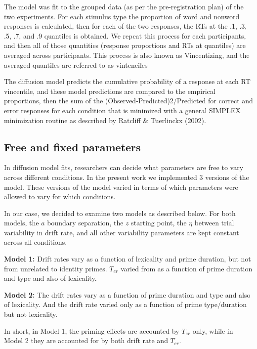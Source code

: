\documentclass[
  english,
  man]{apa6}
\begin{document}
\begin{appendix}
The model was fit to the grouped data (as per the pre-registration plan)
of the two experiments. For each stimulus type the proportion of word
and nonword responses is calculated, then for each of the two responses,
the RTs at the .1, .3, .5, .7, and .9 quantiles is obtained. We repeat
this process for each participants, and then all of those quantities
(response proportions and RTs at quantiles) are averaged across
participants. This process is also known as Vincentizing, and the
averaged quantiles are referred to as vintenciles

The diffusion model predicts the cumulative probability of a response at
each RT vincentile, and these model predictions are compared to the
empirical proportions, then the sum of the
(Observed-Predicted)2/Predicted for correct and error responses for each
condition that is minimized with a general SIMPLEX minimization routine
as described by Ratcliff \& Tuerlinckx (2002).

\hypertarget{free-and-fixed-parameters}{%
\subsection{Free and fixed parameters}\label{free-and-fixed-parameters}}

In diffusion model fits, researchers can decide what parameters are free
to vary across different conditions. In the present work we implemented
3 versions of the model. These versions of the model varied in terms of
which parameters were allowed to vary for which conditions.

In our case, we decided to examine two models as described below. For
both models, the \(a\) boundary separation, the \(z\) starting point,
the \(\eta\) between trial variability in drift rate, and all other
variability parameters are kept constant across all conditions.

\textbf{Model 1:} Drift rates vary as a function of lexicality and prime
duration, but not from unrelated to identity primes. \(T_{er}\) varied
from as a function of prime duration and type and also of lexicality.

\textbf{Model 2:} The drift rates vary as a function of prime duration
and type and also of lexicality. And the drift rate varied only as a
function of prime type/duration but not lexicality.

In short, in Model 1, the priming effects are accounted by \(T_{er}\)
only, while in Model 2 they are accounted for by both drift rate and
\(T_{er}\).


\end{appendix}
\end{document}
